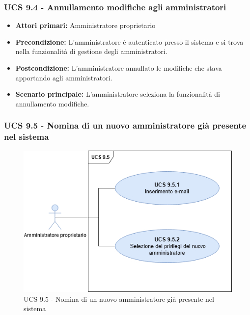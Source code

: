 \subsubsection{UCS 9.4 - Annullamento modifiche agli amministratori}%

\begin{itemize}
\item \textbf{Attori primari:} Amministratore proprietario
\item \textbf{Precondizione:} L'amministratore è autenticato presso il sistema e si trova nella funzionalità di gestione degli amministratori.
\item \textbf{Postcondizione:} L'amministratore annullato le modifiche che stava apportando agli amministratori.
\item \textbf{Scenario principale:} L'amministratore seleziona la funzionalità di annullamento modifiche.
\end{itemize}

\subsubsection{UCS 9.5 - Nomina di un nuovo amministratore già presente nel sistema}%

\begin{figure}[h!]
    \centering
      \includegraphics[scale=0.5]{Sezioni/UseCase/Immagini/UCS9.5.png}
    \caption{UCS 9.5 - Nomina di un nuovo amministratore già presente nel sistema}
  \end{figure}


